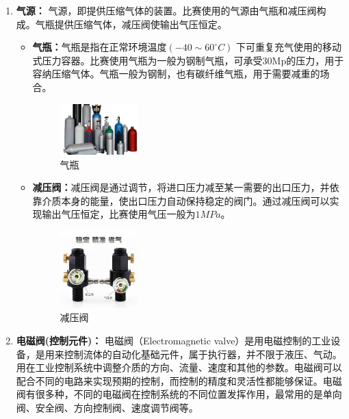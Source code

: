 \documentclass[UTF8]{article} %
\begin{document}
\begin{enumerate}
  \item \textbf{气源：} 
  气源，即提供压缩气体的装置。比赛使用的气源由气瓶和减压阀构成。气瓶提供压缩气体，减压阀使输出气压恒定。
  \begin{itemize}
    \item \textbf{气瓶：}气瓶是指在正常环境温度$(-40 \sim 60^{\circ}C)$ 下可重复充气使用的移动式压力容器。比赛使用气瓶为一般为钢制气瓶，可承受30Mp的压力，用于容纳压缩气体。气瓶一般为钢制，也有碳纤维气瓶，用于需要减重的场合。
    
    \begin{figure}[h]
      \centering
      \includegraphics[width=0.3\textwidth]{qi2.png}
      \caption{气瓶}
    \end{figure}

    \item \textbf{减压阀：}减压阀是通过调节，将进口压力减至某一需要的出口压力，并依靠介质本身的能量，使出口压力自动保持稳定的阀门。通过减压阀可以实现输出气压恒定，比赛使用气压一般为$1MPa$。

    \begin{figure}[h]
      \centering
      \includegraphics[width=0.3\textwidth]{qi3.png}
      \caption{减压阀}
    \end{figure}

  \end{itemize}
  \item \textbf{电磁阀(控制元件)：} 电磁阀（Electromagnetic valve）是用电磁控制的工业设备，是用来控制流体的自动化基础元件，属于执行器，并不限于液压、气动。用在工业控制系统中调整介质的方向、流量、速度和其他的参数。电磁阀可以配合不同的电路来实现预期的控制，而控制的精度和灵活性都能够保证。电磁阀有很多种，不同的电磁阀在控制系统的不同位置发挥作用，最常用的是单向阀、安全阀、方向控制阀、速度调节阀等。
  

\end{enumerate}
\end{document}
